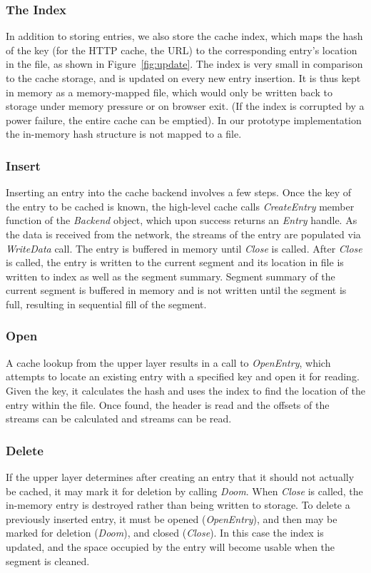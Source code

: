 \documentclass{sig-alternate}
\begin{document}
\subsubsection{The Index}
In addition to storing entries, we also store the cache index, which maps the
hash of the key (for the HTTP cache, the URL) to the corresponding entry's
location in the file, as shown in Figure~\ref{fig:update}.  The index is very
small in comparison to the cache storage, and is updated on every new entry
insertion.  It is thus kept in memory as a memory-mapped file, which would only
be written back to storage under memory pressure or on browser exit. (If the
index is corrupted by a power failure, the entire cache can be emptied).  In our
prototype implementation the in-memory hash structure is not mapped to a file.

\subsubsection{Insert}
Inserting an entry into the cache backend involves a few steps.  Once the key of
the entry to be cached is known, the high-level cache calls \emph{CreateEntry}
member function of the \emph{Backend} object, which upon success returns an
\emph{Entry} handle.  As the data is received from the network, the streams of
the entry are populated via \emph{WriteData} call.  The entry is buffered in
memory until \emph{Close} is called.  After \emph{Close} is called, the entry is
written to the current segment and its location in file is written to index as
well as the segment summary.  Segment summary of the current segment is buffered
in memory and is not written until the segment is full, resulting in sequential
fill of the segment.

\subsubsection{Open}
A cache lookup from the upper layer results in a call to \emph{OpenEntry}, which
attempts to locate an existing entry with a specified key and open it for
reading.  Given the key, it calculates the hash and uses the index to find the
location of the entry within the file.  Once found, the header is read and the
offsets of the streams can be calculated and streams can be read.

\subsubsection{Delete}
If the upper layer determines after creating an entry that it should not
actually be cached, it may mark it for deletion by calling \emph{Doom}.  When
\emph{Close} is called, the in-memory entry is destroyed rather than being
written to storage.  To delete a previously inserted entry, it must be opened
(\emph{OpenEntry}), and then may be marked for deletion (\emph{Doom}), and
closed (\emph{Close}).  In this case the index is updated, and the space
occupied by the entry will become usable when the segment is cleaned.
\end{document}
